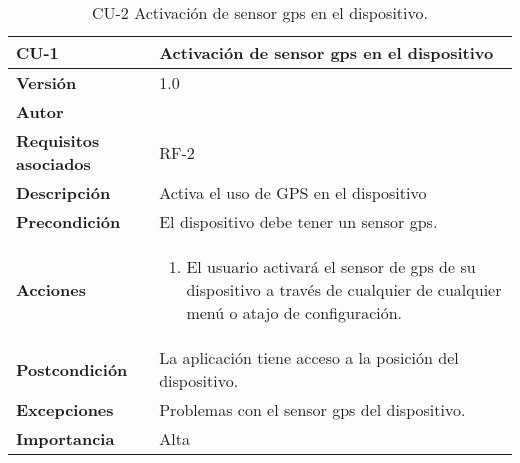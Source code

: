 \begin{table}[p]
	\centering
	\begin{tabularx}{\linewidth}{ p{} p{} }
		\toprule
		\textbf{CU-1}    & \textbf{Activación de sensor \acrshort{gps} en el dispositivo}\\
		\toprule
		\textbf{Versión}              & 1.0    \\
		\textbf{Autor}                & \autor \\
		\textbf{Requisitos asociados} & RF-2 \\
		\textbf{Descripción}          & Activa el uso de GPS en el dispositivo \\
		\textbf{Precondición}         & El dispositivo debe tener un sensor \acrshort{gps}. \\
		\textbf{Acciones}             &
		\begin{enumerate}
			\def\labelenumi{\arabic{enumi}.}
			\tightlist
			\item El usuario activará el sensor de \acrshort{gps} de su dispositivo a través de cualquier de cualquier menú o atajo de configuración.
		\end{enumerate}\\
		\textbf{Postcondición}        & La aplicación tiene acceso a la posición del dispositivo. \\
		\textbf{Excepciones}          & Problemas con el sensor \acrshort{gps} del dispositivo. \\
		\textbf{Importancia}          & Alta \\
		\bottomrule
	\end{tabularx}
	\caption{CU-2 Activación de sensor \acrshort{gps} en el dispositivo.}
\end{table}

